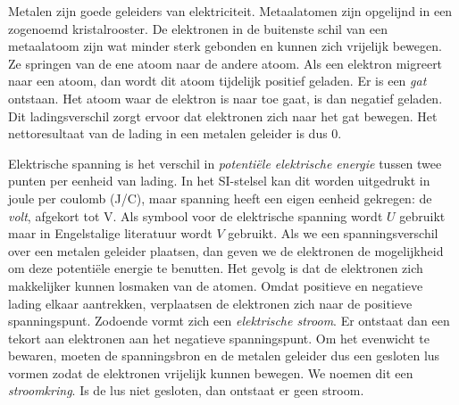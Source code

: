 Metalen zijn goede geleiders van elektriciteit. Metaalatomen zijn opgelijnd in een zogenoemd kristalrooster. De elektronen in de buitenste schil van een metaalatoom zijn wat minder sterk gebonden en kunnen zich vrijelijk bewegen. Ze springen van de ene atoom naar de andere atoom. Als een elektron migreert naar een atoom, dan wordt dit atoom tijdelijk positief geladen. Er is een \textsl{gat} ontstaan. Het atoom waar de elektron is naar toe gaat, is dan negatief geladen. Dit ladingsverschil zorgt ervoor dat elektronen zich naar het gat bewegen. Het nettoresultaat van de lading in een metalen geleider is dus 0.


Elektrische spanning is het verschil in \textsl{potentiële elektrische energie} tussen twee punten per eenheid van lading. In het SI-stelsel kan dit worden uitgedrukt in joule per coulomb (\si[per-mode=symbol]{\joule\per\coulomb}), maar spanning heeft een eigen eenheid gekregen: de \textsl{volt}, afgekort tot \si{\volt}. Als symbool voor de elektrische spanning wordt $U$ gebruikt maar in Engelstalige literatuur wordt $V$ gebruikt. Als we een spanningsverschil over een metalen geleider plaatsen, dan geven we de elektronen de mogelijkheid om deze potentiële energie te benutten. Het gevolg is dat de elektronen zich makkelijker kunnen losmaken van de atomen. Omdat positieve en negatieve lading elkaar aantrekken, verplaatsen de elektronen zich naar de positieve spanningspunt. Zodoende vormt zich een \textsl{elektrische stroom}. Er ontstaat dan een tekort aan elektronen aan het negatieve spanningspunt. Om het evenwicht te bewaren, moeten de spanningsbron en de metalen geleider dus een gesloten lus vormen zodat de elektronen vrijelijk kunnen bewegen. We noemen dit een \textsl{stroomkring}. Is de lus niet gesloten, dan ontstaat er geen stroom.

